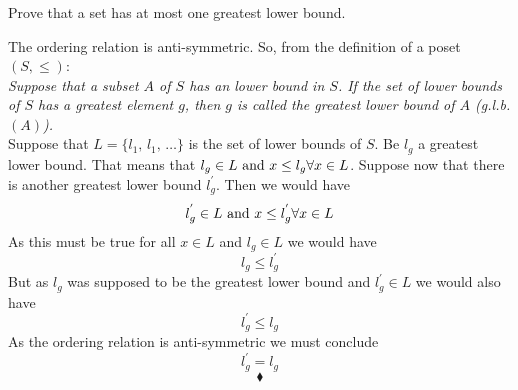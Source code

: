 \subsubsection{}
\begin{tcolorbox}
Prove that a set has at most one greatest lower bound. 
\end{tcolorbox}
The ordering relation is anti-symmetric. So, from the definition of a poset $(S,\leq)$:\\
\textit{Suppose that a subset $A$ of $S$ has an lower bound in $S$. If the set of lower bounds of $S$ has a greatest element $g$, then $g$ is called the greatest lower bound of $A$ (g.l.b.$(A)$).}\\
Suppose that $L=\{l_1,\, l_1,\, \dots \}$ is the set of lower bounds of $S$. Be $l_g$ a greatest lower bound. That means that $l_g\in L\text{ and } x\leq l_g\forall x\in L$. Suppose now that there is another greatest lower bound $l^{'}_g$. Then we would have
$$l^{'}_g\in L\text{ and } x\leq l^{'}_g\forall x\in L$$ 
As this must be true for all $x\in L$ and $l_g\in L$ we would have $$l_g\leq l^{'}_g$$
But as $l_g$ was supposed to be the greatest lower bound and $l^{'}_g\in L$ we would also have 
$$l^{'}_g\leq l^{}_g$$
As the ordering relation is anti-symmetric we must conclude 
$$l^{'}_g= l^{}_g$$
$$\blacklozenge$$
\newpage


\renewcommand{\thesubsection}{\thesection.\RomanNumeralCaps{11}}
\subsection{}
